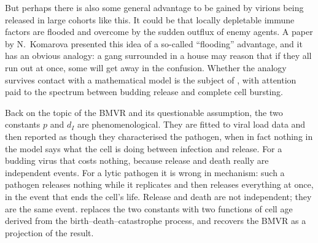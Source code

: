 But perhaps there is also some general advantage to be gained by virions being
released in large cohorts like this. It could be that locally depletable immune
factors are flooded and overcome by the sudden outflux of enemy agents. A paper
by N.~Komarova \cite{komarova2007viral} presented this idea of a so-called
``flooding'' advantage, and it has an obvious analogy: a gang surrounded in a
house may reason that if they all run out at once, some will get away in the
confusion. Whether the analogy survives contact with a mathematical model is
the subject of , with attention paid
to the spectrum between budding release and complete cell bursting.

Back on the topic of the BMVR and its questionable assumption, the two
constants $p$ and $d_I$ are phenomenological. They are fitted to viral load
data and then reported as though they characterised the pathogen, when in fact
nothing in the model says what the cell is doing between infection and release.
For a budding virus that costs nothing, because release and death really are
independent events. For a lytic pathogen it is wrong in mechanism: such a
pathogen releases nothing while it replicates and then releases everything at
once, in the event that ends the cell's life. Release and death are not
independent; they are the same event.
 replaces the two constants
with two functions of cell age derived from the birth--death--catastrophe
process, and recovers the BMVR as a projection of the result.
